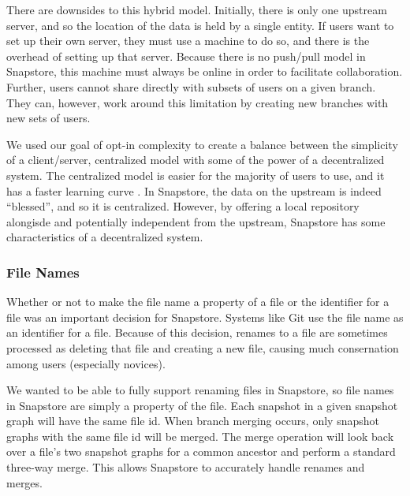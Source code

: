 There are downsides to this hybrid model. Initially, there is only one upstream server, and so the location of the data is held by a single entity. If users want to set up their own server, they must use a machine to do so, and there is the overhead of setting up that server. Because there is no push/pull model in Snapstore, this machine must always be online in order to facilitate collaboration. Further, users cannot share directly with subsets of users on a given branch. They can, however, work around this limitation by creating new branches with new sets of users.

We used our goal of opt-in complexity to create a balance between the simplicity of a client/server, centralized model with some of the power of a decentralized system. The centralized model is easier for the majority of users to use, and it has a faster learning curve \cite{Brindescu}. In Snapstore, the data on the upstream is indeed ``blessed'', and so it is centralized. However, by offering a local repository alongisde and potentially independent from the upstream, Snapstore has some characteristics of a decentralized system.

\subsubsection{File Names}

Whether or not to make the file name a property of a file or the identifier for a file was an important decision for Snapstore. Systems like Git use the file name as an identifier for a file. Because of this decision, renames to a file are sometimes processed as deleting that file and creating a new file, causing much consernation among users (especially novices)\cite{Rosso}.

We wanted to be able to fully support renaming files in Snapstore, so file names in Snapstore are simply a property of the file. Each snapshot in a given snapshot graph will have the same file id. When branch merging occurs, only snapshot graphs with the same file id will be merged. The merge operation will look back over a file's two snapshot graphs for a common ancestor and perform a standard three-way merge. This allows Snapstore to accurately handle renames and merges.



